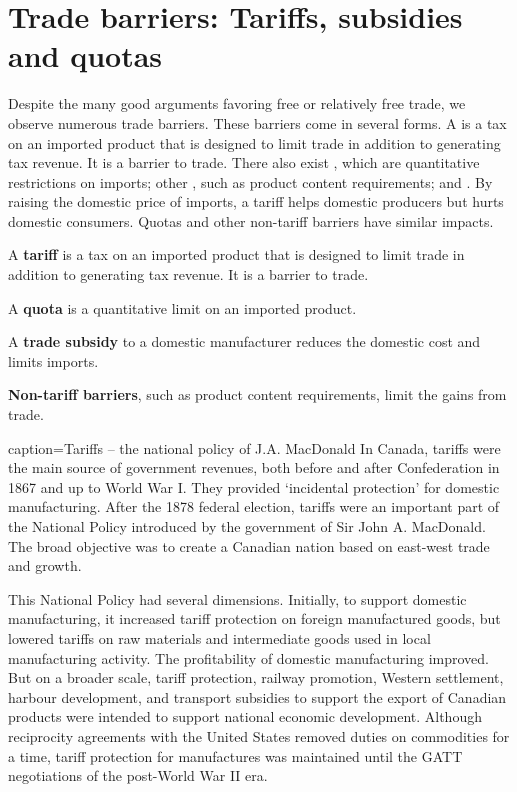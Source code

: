 \section{Trade barriers: Tariffs, subsidies and quotas}\label{sec:ch15sec5}

Despite the many good arguments favoring free or relatively free trade, we
observe numerous trade barriers. These barriers come in several forms. A %
 is a tax on an imported product that is designed to
limit trade in addition to generating tax revenue. It is a barrier to trade.
There also exist , which are quantitative restrictions
on imports; other , such as product content
requirements; and . By raising the domestic price of
imports, a tariff helps domestic producers but hurts domestic consumers.
Quotas and other non-tariff barriers have similar impacts.

\begin{DefBox}
	A \textbf{tariff} is a tax on an imported product that is designed to limit trade in addition to generating tax revenue. It is a barrier to trade.
	
	A \textbf{quota} is a quantitative limit on an imported product.
	
	A \textbf{trade subsidy} to a domestic manufacturer reduces the domestic cost and limits imports.
	
	\textbf{Non-tariff barriers}, such as product content requirements, limit the gains from trade.
\end{DefBox}

\newhtmlpage

\begin{ApplicationBox}{caption={Tariffs -- the national policy of J.A. MacDonald \label{app:ch15app2}}}
	In Canada, tariffs were the main source of government revenues, both before and after Confederation in 1867 and up to World War I. They provided `incidental protection' for domestic manufacturing. After the 1878 federal election, tariffs were an important part of the National Policy introduced by the government of Sir John A. MacDonald. The broad objective was to create a Canadian nation based on east-west trade and growth.

	This National Policy had several dimensions. Initially, to support domestic manufacturing, it increased tariff protection on foreign manufactured goods, but lowered tariffs on raw materials and intermediate goods used in local manufacturing activity. The profitability of domestic manufacturing improved. But on a broader scale, tariff protection, railway promotion, Western settlement, harbour development, and transport subsidies to support the export of Canadian products were intended to support national economic development. Although reciprocity agreements  with the United States removed duties on commodities for a time, tariff protection for manufactures was maintained until the GATT negotiations of the post-World War II era. 
\end{ApplicationBox}

